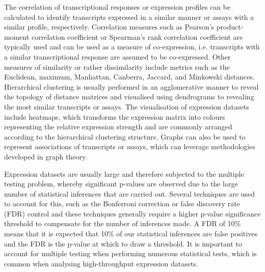 The correlation of transcriptional responses or expression profiles can be calculated to identify transcripts expressed in a similar manner or assays with a similar profile, respectively. Correlation measures such as Pearson's product-moment correlation coefficient or Spearman's rank correlation coefficient are typically used and can be used as a measure of co-expression, i.e. transcripts with a similar transcriptional response are assumed to be co-expressed. Other measures of similarity or rather dissimilarity include metrics such as the Euclidean, maximum, Manhattan, Canberra, Jaccard, and Minkowski distances. Hierarchical clustering is usually performed in an agglomerative manner to reveal the topology of distance matrices and visualised using dendrograms to revealing the most similar transcripts or assays. The visualisation of expression datasets include heatmaps, which transforms the expression matrix into colours representing the relative expression strength and are commonly arranged according to the hierarchical clustering structure\cite{pmid9843981}. Graphs can also be used to represent associations of transcripts or assays, which can leverage methodologies developed in graph theory.

Expression datasets are usually large and therefore subjected to the multiple testing problem, whereby significant p-values are observed due to the large number of statistical inferences that are carried out. Several techniques are used to account for this, such as the Bonferroni correction or false discovery rate (FDR) control\cite{fdr_paper} and these techniques generally require a higher p-value significance threshold to compensate for the number of inferences made. A FDR of 10\% means that it is expected that 10\% of our statistical inferences are false positives and the FDR is the p-value at which to draw a threshold. It is important to account for multiple testing when performing numerous statistical tests, which is common when analysing high-throughput expression datasets.
